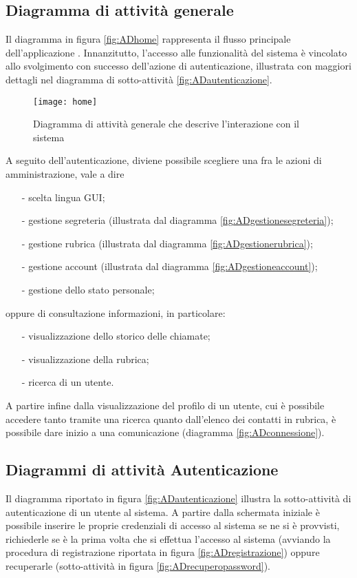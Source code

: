 \subsection{Diagramma di attività generale}

Il diagramma in figura \vref{fig:ADhome} rappresenta il flusso principale dell'applicazione \caName. Innanzitutto, l'accesso alle funzionalità del sistema è vincolato allo svolgimento con successo dell'azione di autenticazione, illustrata con maggiori dettagli nel diagramma di sotto-attività \vref{fig:ADautenticazione}.

\begin{figure}[H]
\centering
\texttt{[image: home]}
\caption{Diagramma di attività generale che descrive l'interazione con il sistema}\label{fig:ADhome}
\end{figure}

A seguito dell'autenticazione, diviene possibile scegliere una fra le azioni di amministrazione, vale a dire
\begin{itemize}[noitemsep,nolistsep]
  \item[-] scelta lingua GUI;
  \item[-] gestione segreteria (illustrata dal diagramma \ref{fig:ADgestionesegreteria});
  \item[-] gestione rubrica (illustrata dal diagramma \ref{fig:ADgestionerubrica});
  \item[-] gestione account (illustrata dal diagramma \ref{fig:ADgestioneaccount});
  \item[-] gestione dello stato personale;
\end{itemize}
oppure di consultazione informazioni, in particolare:
\begin{itemize}[noitemsep,nolistsep]
  \item[-] visualizzazione dello storico delle chiamate;
  \item[-] visualizzazione della rubrica;
  \item[-] ricerca di un utente.
\end{itemize}

A partire infine dalla visualizzazione del profilo di un utente, cui è possibile accedere tanto tramite una ricerca quanto dall'elenco dei contatti in rubrica, è possibile dare inizio a una comunicazione (diagramma \vref{fig:ADconnessione}).

\subsection{Diagrammi di attività Autenticazione}
Il diagramma riportato in figura \vref{fig:ADautenticazione} illustra la sotto-attività di autenticazione di un utente al sistema. A partire dalla schermata iniziale è possibile inserire le proprie credenziali di accesso al sistema se ne si è provvisti, richiederle se è la prima volta che si effettua l'accesso al sistema (avviando la procedura di registrazione riportata in figura \ref{fig:ADregistrazione}) oppure recuperarle (sotto-attività in figura \vref{fig:ADrecuperopassword}).

